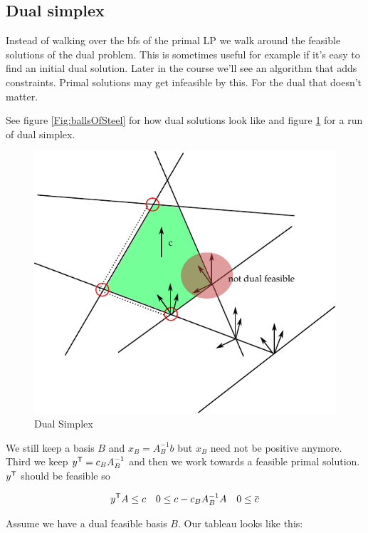 \subsection{Dual simplex}

Instead of walking over the bfs of the primal LP we walk around the feasible solutions of the dual problem. This is sometimes useful for example if it's easy to find an initial dual solution. Later in the course we'll see an algorithm that adds constraints. Primal solutions may get infeasible by this. For the dual that doesn't matter.

See figure \ref{Fig:ballsOfSteel} for how dual solutions look like and figure \ref{Fig:dualSimplex} for a run of dual simplex.

\begin{figure}[hbt]
\begin{center}
\includegraphics{./images/dualSimplex.pdf}
\end{center}
\caption{Dual Simplex}
\label{Fig:dualSimplex}
\end{figure}

We still keep a basis $B$ and $x_B=A_B^{-1}b$ but $x_B$ need not be positive anymore. Third we keep ${y}^\text{\upshape \sffamily T}=c_BA_B^{-1}$ and then we work towards a feasible primal solution. ${y}^\text{\upshape \sffamily T}$ should be feasible so 

\[{y}^\text{\upshape \sffamily T} A \leq c \quad 0 \leq c-c_BA_B^{-1}A \quad 0\leq \overline c\]

Assume we have a dual feasible basis $B$. Our tableau looks like this:

